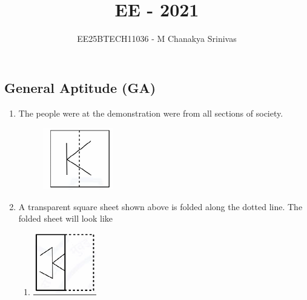 \documentclass[journal,12pt,onecolumn]{IEEEtran}
\title{\LARGE \textbf{EE - 2021}}
\author{\Large EE25BTECH11036 - M Chanakya Srinivas}
\date{}
\theoremstyle{remark}
\begin{document}
\maketitle
\begin{flushleft}


\section*{General Aptitude (GA)}

\begin{enumerate}


\item The people \underline{\hspace{2cm}} were at the demonstration were from all sections of society.
\begin{enumerate}
\end{enumerate}
\begin{figure}[h]
    \centering
    \includegraphics[width=0.5\columnwidth]{figs/2.png}
    \caption{}
    \label{fig:placeholder}
\end{figure}

\item A transparent square sheet shown above is folded along the dotted line. The folded sheet will look like
\begin{enumerate}
   
    \item 
        \includegraphics[width=0.25\columnwidth]{figs/2-a.png}
    

\end{enumerate}
\end{enumerate}
\end{flushleft}
\end{document}
